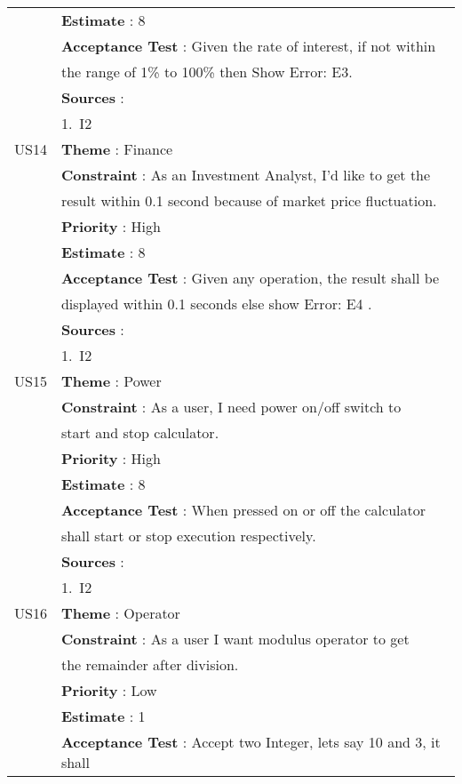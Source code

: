 \documentclass{article}
\begin{document}
\begin{longtable}{|| c || l ||}
         & \textbf{Estimate} : 8 \\
         & \textbf{Acceptance Test} : Given the rate of interest, if not within \\ 
         & the range of 1\% to 100\% then Show Error: E3. \\
         & \textbf{Sources} : \\
         & 1.~I2 \\
         \hline
         US14 & \textbf{Theme} : Finance \\
         & \textbf{Constraint} : As an Investment Analyst, I'd like to get the \\ 
         & result within 0.1 second because of market price fluctuation.\\ 
         & \textbf{Priority} : High \\
         & \textbf{Estimate} : 8 \\
         & \textbf{Acceptance Test} : Given any operation, the result shall be \\ 
         & displayed within 0.1 seconds else show Error: E4 . \\
         & \textbf{Sources} : \\
         & 1.~I2 \\
         \hline
         US15 & \textbf{Theme} : Power \\
         & \textbf{Constraint} : As a user, I need power on/off switch to \\ 
         & start and stop calculator.\\
         & \textbf{Priority} : High \\
         & \textbf{Estimate} : 8 \\
         & \textbf{Acceptance Test} : When pressed on or off the calculator \\
         & shall start or stop execution respectively.\\
         & \textbf{Sources} : \\
         & 1.~I2 \\
         \hline
         US16 & \textbf{Theme} : Operator \\
         & \textbf{Constraint} : As a user I want modulus operator to get \\
         & the remainder after division.\\
         & \textbf{Priority} : Low \\
         & \textbf{Estimate} : 1 \\
         & \textbf{Acceptance Test} : Accept two Integer, lets say 10 and 3, it shall\\

\end{longtable}
\end{document}
